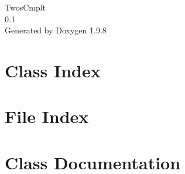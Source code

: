 \documentclass[twoside]{book}
\newcommand{\+}{\discretionary{\mbox{\scriptsize$\hookleftarrow$}}{}{}}
\newcommand{\clearemptydoublepage}{%
    \newpage{\pagestyle{empty}\cleardoublepage}%
  }
\begin{document}
  \raggedbottom
    \hypersetup{pageanchor=false,
                bookmarksnumbered=true,
                pdfencoding=unicode
               }
  \begin{titlepage}
  \vspace*{7cm}
  \begin{center}%
  {\Large Twos\+Cmplt}\\
  [1ex]\large 0.\+1 \\
  \vspace*{1cm}
  {\large Generated by Doxygen 1.9.8}\\
  \end{center}
  \end{titlepage}
  \clearemptydoublepage
  \tableofcontents
  \clearemptydoublepage
  \hypersetup{pageanchor=true}









\chapter{Class Index}

\chapter{File Index}

\chapter{Class Documentation}



\end{document}
